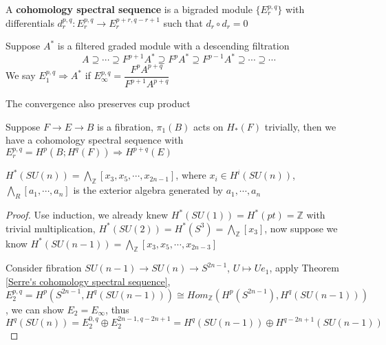 \documentclass[../main.tex]{subfiles}
\begin{document}
\begin{definition}
A \textbf{cohomology spectral sequence} is a bigraded module $\{E^{p,q}_r\}$ with differentials $d^{p,q}_r:E^{p,q}_r\to E^{p+r,q-r+1}_r$ such that $d_r\circ d_r=0$ \par
Suppose $A^*$ is a filtered graded module with a descending filtration
\[A\supseteq\cdots\supseteq F^{p+1}A^*\supseteq F^pA^*\supseteq F^{p-1}A^*\supseteq\cdots\supseteq\cdots\]
We say $E^{p,q}_1\Rightarrow A^*$ if $E^{p,q}_\infty=\dfrac{F^pA^{p+q}}{F^{p+1}A^{p+q}}$
\end{definition}

\begin{remark}
The convergence also preserves cup product
\end{remark}

\begin{theorem}\label{Serre's cohomology spectral sequence}
Suppose $F\to E\to B$ is a fibration, $\pi_1(B)$ acts on $H_*(F)$ trivially, then we have a cohomology spectral sequence with $E^{p,q}_r=H^p(B;H^q(F))\Rightarrow H^{p+q}(E)$
\end{theorem}

\begin{example}
$H^*(SU(n))=\bigwedge_{\mathbb Z}[x_3,x_5,\cdots,x_{2n-1}]$, where $x_i\in H^i(SU(n))$, $\bigwedge_R[a_1,\cdots,a_n]$ is the exterior algebra generated by $a_1,\cdots,a_n$
\end{example}

\begin{proof}
Use induction, we already knew $H^*(SU(1))=H^*(pt)=\mathbb Z$ with trivial multiplication, $H^*(SU(2))=H^*(S^3)=\bigwedge_\mathbb{Z}[x_3]$, now suppose we know $H^*(SU(n-1))=\bigwedge_{\mathbb Z}[x_3,x_5,\cdots,x_{2n-3}]$ \par
Consider fibration $SU(n-1)\to SU(n)\to S^{2n-1}$, $U\mapsto Ue_1$, apply Theorem \ref{Serre's cohomology spectral sequence}, $E^{p,q}_2=H^p(S^{2n-1},H^q(SU(n-1)))\cong Hom_{\mathbb Z}(H^p(S^{2n-1}),H^q(SU(n-1)))$, we can show $E_2=E_\infty$, thus $H^q(SU(n))=E^{0,q}_2\oplus E^{2n-1,q-2n+1}_2=H^q(SU(n-1))\oplus H^{q-2n+1}(SU(n-1))$
\end{proof}
\end{document}
